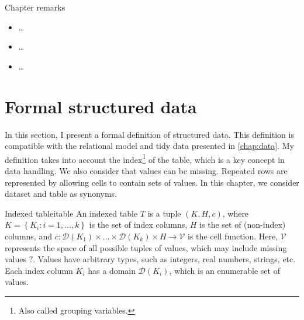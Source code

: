 \begin{mainbox}{Chapter remarks}


  \startcontents[chapters]
  \vspace{1em}


  \begin{itemize}
    \item \dots
  \end{itemize}


  \begin{itemize}
    \item \dots
  \end{itemize}


  \begin{itemize}
    \item \dots
  \end{itemize}
\end{mainbox}

{}
\clearpage

\section{Formal structured data}

\newcommand{\domainof}[1]{\mathcal{D}\!\left(#1\right)}
\newcommand{\missing}{\text{?}}
\newcommand{\rowcard}[1][k_1, \dots, k_k]{\operatorname{card}\!\left(#1\right)}

In this section, I present a formal definition of structured data.  This definition is
compatible with the relational model and tidy data presented in \cref{chap:data}.
My definition takes into account the index\footnote{Also called grouping variables.} of
the table, which is a key concept in data handling.  We also consider that values can be
missing.  Repeated rows are represented by allowing cells to contain sets of values.
In this chapter, we consider dataset and table as synonyms.

\begin{defbox}{Indexed table}{itable}
An indexed table $T$ is a tuple $(K, H, c)$, where $K = \left\{K_i : i = 1, \dots,
k\right\}$ is the set of index columns, $H$ is the set of (non-index) columns, and $c :
\domainof{K_1} \times \dots \times \domainof{K_k} \times H \to \mathcal{V}$ is the cell function.
Here, $\mathcal{V}$ represents the space of all possible tuples of values, which
may include missing values $\missing$.  Values have arbitrary types, such as integers,
real numbers, strings, etc.
Each index column $K_i$ has a domain $\domainof{K_i}$, which is an enumerable set of
values.
\end{defbox}

